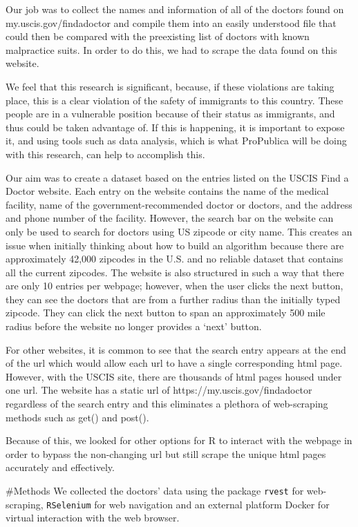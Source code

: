 \documentclass[10pt,letterpaper]{article}
\begin{document}
Our job was to collect the names and information of all of the doctors
found on my.uscis.gov/findadoctor and compile them into an easily
understood file that could then be compared with the preexisting list of
doctors with known malpractice suits. In order to do this, we had to
scrape the data found on this website.

We feel that this research is significant, because, if these violations
are taking place, this is a clear violation of the safety of immigrants
to this country. These people are in a vulnerable position because of
their status as immigrants, and thus could be taken advantage of. If
this is happening, it is important to expose it, and using tools such as
data analysis, which is what ProPublica will be doing with this
research, can help to accomplish this.

Our aim was to create a dataset based on the entries listed on the USCIS
Find a Doctor website. Each entry on the website contains the name of
the medical facility, name of the government-recommended doctor or
doctors, and the address and phone number of the facility. However, the
search bar on the website can only be used to search for doctors using
US zipcode or city name. This creates an issue when initially thinking
about how to build an algorithm because there are approximately 42,000
zipcodes in the U.S. and no reliable dataset that contains all the
current zipcodes. The website is also structured in such a way that
there are only 10 entries per webpage; however, when the user clicks the
next button, they can see the doctors that are from a further radius
than the initially typed zipcode. They can click the next button to span
an approximately 500 mile radius before the website no longer provides a
`next' button.

For other websites, it is common to see that the search entry appears at
the end of the url which would allow each url to have a single
corresponding html page. However, with the USCIS site, there are
thousands of html pages housed under one url. The website has a static
url of https://my.uscis.gov/findadoctor regardless of the search entry
and this eliminates a plethora of web-scraping methods such as get() and
post().

Because of this, we looked for other options for R to interact with the
webpage in order to bypass the non-changing url but still scrape the
unique html pages accurately and effectively.

\#Methods We collected the doctors' data using the package
\texttt{rvest} for web-scraping, \texttt{RSelenium} for web navigation
and an external platform Docker for virtual interaction with the web
browser.
\end{document}
